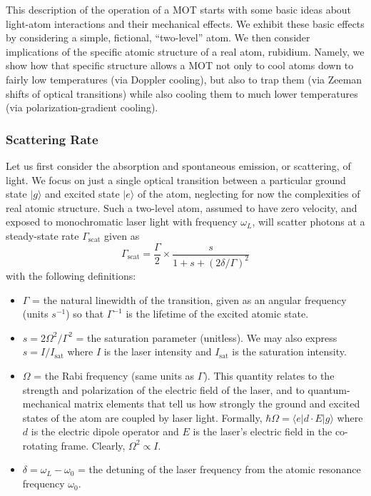 \documentclass{../lab}
\begin{document}
This description of the operation of a MOT starts with some basic ideas about light-atom interactions and their mechanical effects. We exhibit these basic effects by considering a simple, fictional, ``two-level'' atom. We then consider implications of the specific atomic structure of a real atom, rubidium. Namely, we show how that specific structure allows a MOT not only to cool atoms down to fairly low temperatures (via Doppler cooling), but also to trap them (via Zeeman shifts of optical transitions) while also cooling them to much lower temperatures (via polarization-gradient cooling).

\subsubsection{Scattering Rate}

Let us first consider the absorption and spontaneous emission, or scattering, of light. We focus on just a single optical transition between a particular ground state $|g\rangle$ and excited state $|e\rangle$ of the atom, neglecting for now the complexities of real atomic structure. Such a two-level atom, assumed to have zero velocity, and exposed to monochromatic laser light with frequency $\omega_L$, will scatter photons at a steady-state rate $\Gamma_\text{scat}$ given as
\begin{equation}
    \Gamma_\text{scat} = \frac{\Gamma}{2} \times \frac{s}{1 + s + (2\delta/\Gamma)^2}
\end{equation}
with the following definitions:

\begin{itemize}
    \item $\Gamma$ = the natural linewidth of the transition, given as an angular frequency (units $s^{-1}$) so that $\Gamma^{-1}$ is the lifetime of the excited atomic state.

    \item $s = 2\Omega^2/\Gamma^2$ = the saturation parameter (unitless). We may also express $s = I/I_\text{sat}$ where $I$ is the laser intensity and $I_\text{sat}$ is the saturation intensity.

    \item $\Omega$ = the Rabi frequency (same units as $\Gamma$). This quantity relates to the strength and polarization of the electric field of the laser, and to quantum-mechanical matrix elements that tell us how strongly the ground and excited states of the atom are coupled by laser light. Formally, $\hbar\Omega =  \langle e|d\cdot E|g\rangle$ where $d$ is the electric dipole operator and $ E$ is the laser’s electric field in the co-rotating frame. Clearly, $\Omega^2 \propto  I$.

    \item $\delta = \omega_L - \omega_0$ = the detuning of the laser frequency from the atomic resonance frequency $\omega_0$.
\end{itemize}
\end{document}
